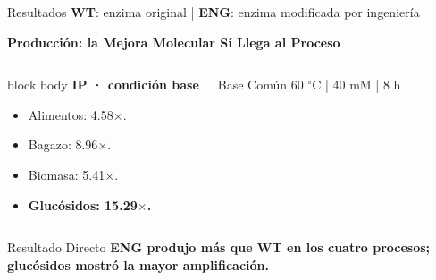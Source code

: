 \begin{frame}{Resultados \hfill{\tiny\color{TextoSuave}\textbf{WT}: enzima original \quad | \quad \textbf{ENG}: enzima modificada por ingeniería}}



{\color{Cian}\bfseries Producción: la Mejora Molecular Sí Llega al Proceso}\par
\vspace{0.06cm}

\begin{columns}[T,onlytextwidth]

\begin{beamercolorbox}[wd=\linewidth,sep=0.12cm,rounded=true]{block body}
\small
\textbf{IP · condición base}
\begin{itemize}
\item Alimentos: 4.58$\times$.
\item Bagazo: 8.96$\times$.
\item Biomasa: 5.41$\times$.
\item \textbf{Glucósidos: 15.29$\times$.}
\end{itemize}
\end{beamercolorbox}

\vspace{0.08cm}
\begin{block}{Base Común}
\centering\small
60 $^{\circ}$C | 40 mM | 8 h
\end{block}
\end{columns}

\vspace{0.07cm}
\begin{alertblock}{Resultado Directo}
\centering\small\bfseries
ENG produjo más que WT en los cuatro procesos; glucósidos mostró la mayor amplificación.
\end{alertblock}
\end{frame}
